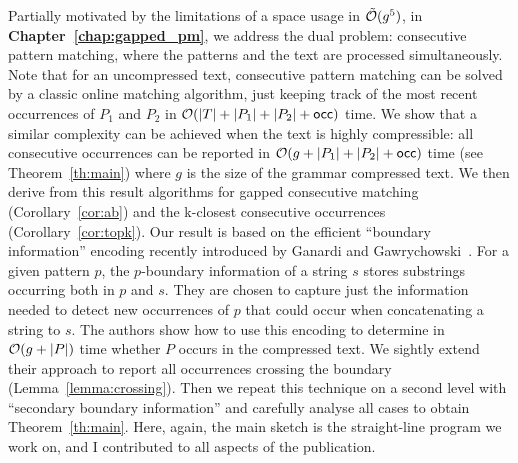 Partially motivated by the limitations of a space usage in $\tilde {\mathcal{O}}(g^5)$, in \textbf{Chapter~\ref{chap:gapped_pm}}, we address the dual problem: consecutive pattern matching, where the patterns and the text are processed simultaneously. Note that for an uncompressed text, consecutive pattern matching can be solved by a classic online matching algorithm, just keeping track of the most recent occurrences of $P_1$ and $P_2$ in $\mathcal{O}(|T|+|P_1|+|P_2|+\mathsf{occ})$ time.
We show that a similar complexity can be achieved when the text is highly compressible: all consecutive occurrences can be reported in $\mathcal{O}(g+|P_1|+|P_2|+\mathsf{occ})$ time (see Theorem~\ref{th:main}) where $g$ is the size of the grammar compressed text. We then derive from this result algorithms for gapped consecutive matching (Corollary~\ref{cor:ab}) and the k-closest consecutive occurrences (Corollary~\ref{cor:topk}).
Our result is based on the efficient ``boundary information'' encoding recently introduced by Ganardi and Gawrychowski~\cite{DBLP:conf/soda/GanardiG22}. For a given pattern $p$, the $p$-boundary information of a string $s$ stores substrings occurring both in $p$ and $s$. They are chosen to capture just the information needed to detect new occurrences of $p$ that could occur when concatenating a string to $s$.
The authors show how to use this encoding to determine in $\mathcal{O}(g+|P|)$ time whether $P$ occurs in the compressed text. We sightly extend their approach to report all occurrences crossing the boundary (Lemma~\ref{lemma:crossing}). Then we repeat this technique on a second level with ``secondary boundary information'' and carefully analyse all cases to obtain Theorem~\ref{th:main}. Here, again, the main sketch is the straight-line program we work on, and I contributed to all aspects of the publication.

